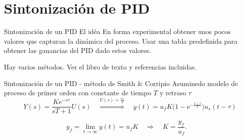 \documentclass[presentation,aspectratio=1610]{beamer}
\begin{document}
\section{Sintonización de PID}
\label{sec:org9641e83}
\begin{frame}[label={sec:orgc0823db}]{Sintonización de un PID}
\alert{El idéa} En forma experimental obtener unos pocos valores que capturan la dinámica del proceso. Usar una tabla predefinida para obtener las ganancias del PID dado estos valores.

Hay varios métodos. Ver el libro de texto y referencias incluidas.
\end{frame}

\begin{frame}[label={sec:org7a9d1cb}]{Sintonización de un PID - método de Smith \& Corripio}
Asuminedo modelo de proceso de primer orden con constante de tiempo \(T\) y retraso \(\tau\)
\[  \quad Y(s) = \frac{K\mathrm{e}^{-s\tau}}{sT + 1}U(s) \quad \overset{U(s) = \frac{u_f}{s}}{\Longrightarrow} \quad y(t) = u_f K\big( 1 - \mathrm{e}^{-\frac{t-\tau}{T}}\big)u_s(t-\tau)\]
\def\Tcnst{3}
\def\tdelay{0.6}
\def\ggain{2}
\def\uampl{0.8}
\pgfmathsetmacro{\yfinal}{\uampl*\ggain}
\pgfmathsetmacro{\tone}{\tdelay + \Tcnst/3}
\pgfmathsetmacro{\two}{\tdelay + \Tcnst}

\begin{center}
\end{center}

\[ y_f = \lim_{t\to\infty} y(t) = u_f K \quad \Rightarrow \quad K = \frac{y_f}{u_f}. \]
\end{frame}
\end{document}
